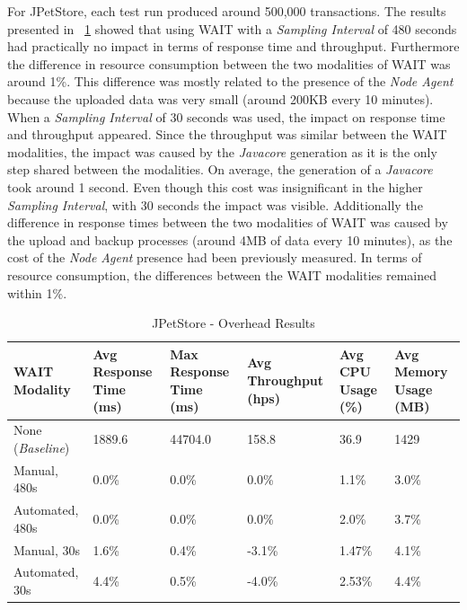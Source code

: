 \documentclass[runningheads,a4paper]{llncs}
\begin{document}
For JPetStore, each test run produced around 500,000 transactions. The results
presented in \tablename ~\ref{PetStore1} showed that using WAIT with a
\emph{Sampling Interval} of 480 seconds had practically no impact in terms of
response time and throughput. Furthermore the difference in resource consumption
between the two modalities of WAIT was around 1\%.  This difference was
mostly related to the presence of the \emph{Node Agent} because the uploaded
data was very small (around 200KB every 10 minutes). When a
\emph{Sampling Interval} of 30 seconds was used, the impact on response time
and throughput appeared. Since the throughput was similar between the WAIT
modalities, the impact was caused by the \emph{Javacore} generation as it is
the only step shared between the modalities. On average, the generation of a
\emph{Javacore} took around 1 second. Even though this cost was insignificant in
the higher \emph{Sampling Interval}, with 30 seconds the impact was visible.
Additionally the difference in response times between the two modalities of WAIT
was caused by the upload and backup processes (around 4MB of data every 10
minutes), as the cost of the \emph{Node Agent} presence had been previously
measured. In terms of resource consumption, the differences between the WAIT
modalities remained within 1\%.

\vspace{-5pt}
\begin{table}[!h]
\caption{JPetStore - Overhead Results}
\label{PetStore1}
\centering
\begin{tabular}{p{}|p{}|p{}|p{}|p{}|p{}}
\hline
\bfseries WAIT Modality & \bfseries Avg Response Time (ms)& \bfseries Max
Response Time (ms)& \bfseries Avg Throughput (hps)& \bfseries Avg CPU Usage
(\%) & \bfseries Avg Memory Usage (MB)\\
\hline
None (\emph{Baseline}) 	& 1889.6	& 44704.0	& 158.8 	& 36.9 		& 1429\\
Manual, 480s 			& 0.0\% 	& 0.0\%		& 0.0\%		& 1.1\% 	& 3.0\%\\
Automated, 480s 		& 0.0\%		& 0.0\%		& 0.0\% 	& 2.0\% 	& 3.7\%\\
Manual, 30s 			& 1.6\%		& 0.4\%		& -3.1\% 	& 1.47\% 	& 4.1\%\\
Automated, 30s 			& 4.4\%		& 0.5\%		& -4.0\% 	& 2.53\% 	& 4.4\%\\
\hline
\end{tabular}
\end{table}
\vspace{-5pt}
\end{document}
